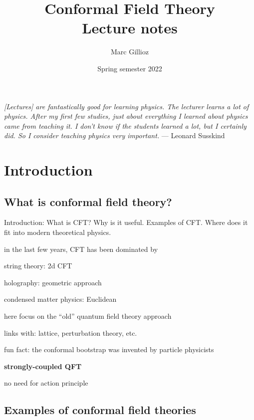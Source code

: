 \documentclass[a4paper,12pt]{article}
\title{%
Conformal Field Theory
\\[1em]
\Large
Lecture notes}
\author{Marc Gillioz}
\date{Spring semester 2022}
\numberwithin{equation}{section}
\begin{document}
 

\maketitle

\begin{center}
	\parbox{11.5cm}{\emph{%
[Lectures] are fantastically good for learning physics. The lecturer learns a lot of physics. After my first few studies, just about everything I learned about physics came from teaching it. I don’t know if the students learned a lot, but I certainly did. So I consider teaching physics very important.} --- Leonard Susskind}
\end{center}


\newpage

\tableofcontents


\newpage
\section{Introduction}

\subsection{What is conformal field theory?}

Introduction: What is CFT? Why is it useful. Examples of CFT. Where does it fit into modern theoretical physics.


in the last few years, CFT has been dominated by 

string theory: 2d CFT

holography: geometric approach

condensed matter physics: Euclidean


here focus on the ``old'' quantum field theory approach

links with: lattice, perturbation theory, etc.

fun fact: the conformal bootstrap was invented by particle physicists


\textbf{strongly-coupled QFT}

no need for action principle


\subsection{Examples of conformal field theories}
\end{document}
